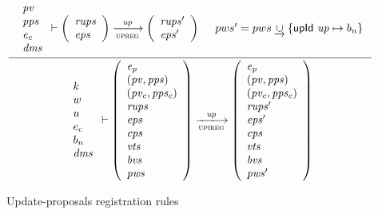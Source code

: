 \begin{figure}[htb]
  \begin{equation}
    \label{eq:rule:upi-reg-interface}
    \inference
    {
      {
        \begin{array}{l}
          \var{pv}\\
          \var{pps}\\
          \var{e_c}\\
          \var{dms}
        \end{array}
      }
      \vdash
      {
        \left(
          \begin{array}{l}
            \var{rups}\\
            \var{eps}
          \end{array}
        \right)
      }
      \trans{upreg}{\var{up}}
      {
        \left(
          \begin{array}{l}
            \var{rups'}\\
            \var{eps'}
          \end{array}
        \right)
      }
      &
      pws' = pws \unionoverride \{ \upId{up} \mapsto b_n\}
    }
    {
      {
        \begin{array}{l}
          k\\
          w\\
          u\\
          e_c\\
          b_n\\
          \var{dms}
        \end{array}
      }
      \vdash
      {
        \left(
          \begin{array}{l}
            \var{e_p}\\
            (\var{pv}, \var{pps})\\
            (\var{pv_c}, \var{pps_c})\\
            \var{rups}\\
            \var{eps}\\
            \var{cps}\\
            \var{vts}\\
            \var{bvs}\\
            \var{pws}
          \end{array}
        \right)
      }
      \trans{upireg}{\var{up}}
      {
        \left(
          \begin{array}{l}
            \var{e_p}\\
            (\var{pv}, \var{pps})\\
            (\var{pv_c}, \var{pps_c})\\
            \var{rups'}\\
            \var{eps'}\\
            \var{cps}\\
            \var{vts}\\
            \var{bvs}\\
            \var{pws'}
          \end{array}
        \right)
      }
    }
  \end{equation}
  \caption{Update-proposals registration rules}
  \label{fig:rules:upi-reg-interface}
\end{figure}

